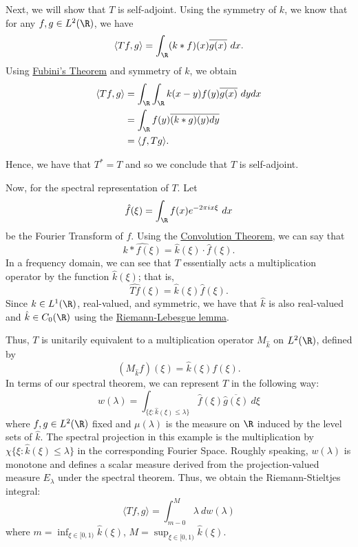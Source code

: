    Next, we will show that \( T  \) is self-adjoint. Using the symmetry of \( k  \), we know that for any \( f,g \in L^{2}(\R) \), we have 
   \[  \langle Tf  , g  \rangle = \int_{ \R  } (k * f)(x) \overline{g(x)}   \ dx. \]
   Using {\hyperref[Fubini's Theorem]{Fubini's Theorem}}  and symmetry of \( k  \), we obtain
   \begin{align*}
       \langle Tf , g  \rangle &= \int_{ \R  } \int_{ \R  } k (x-y) f(y) \overline{g(x)} \ dy dx \\
                               &=  \int_{\R} f(y) \overline{(k * g)(y) dy} \\
                               &= \langle f , Tg \rangle.
\end{align*}

Hence, we have that \( T^{*} = T  \) and so we conclude that \( T  \) is self-adjoint.

Now, for the spectral representation of \( T \). Let 
\[ \hat{f}(\xi) = \int_{ \R } f(x) e^{-2 \pi i x \xi}  \ dx  \]
be the Fourier Transform of \( f \). Using the {\hyperref[Convolution Theorem]{Convolution Theorem}}, we can say that 
\[  \hat{k * f(\xi)} = \hat{k}(\xi) \cdot \hat{f} (\xi). \]
In a frequency domain, we can see that \( T  \) essentially acts a multiplication operator by the function \( \hat{k}(\xi) \); that is, 
\[  \hat{Tf}(\xi) = \hat{k}(\xi) \hat{f}(\xi). \]
Since \( k \in L^{1} (\R) \), real-valued, and symmetric, we have that \( \hat{k} \) is also real-valued and \( \hat{k} \in {C}_{0}(\R) \) using the {\hyperref[Riemann-Lebesgue]{Riemann-Lebesgue lemma}}.

Thus, \( T  \) is unitarily equivalent to a multiplication operator \( {M}_{\hat{k}}  \) on \( L^{2}(\R) \), defined by 
\[  ({M}_{\hat{k}}f)(\xi) = \hat{k}(\xi) f(\xi). \]
In terms of our spectral theorem, we can represent \( T  \) in the following way:
\[  w(\lambda) = \int_{ \{ \xi: \hat{k}(\xi) \leq \lambda \} } \hat{f}(\xi) \overline{\hat{g}(\xi)}    \ d \xi \]
where \( f,g \in L^{2}(\R) \) fixed and \( \mu(\lambda) \) is the measure on \( \R  \) induced by the level sets of \( \hat{k} \). The spectral projection in this example is the multiplication by \( \chi \{ \xi : \hat{k}(\xi) \leq \lambda \}  \) in the corresponding Fourier Space. Roughly speaking, \( w(\lambda) \) is monotone and defines a scalar measure derived from the projection-valued measure \( {E}_{\lambda} \) under the spectral theorem. Thus, we obtain the Riemann-Stieltjes integral: 
\[  \langle Tf  ,  g  \rangle = \int_{ m - 0  }^{ M  }  \lambda  \ d w(\lambda) \]
where \( m = \inf_{\xi \in [0,1)} \hat{k}(\xi) \), \( M = \sup_{\xi \in [0,1)} \hat{k}(\xi) \).

